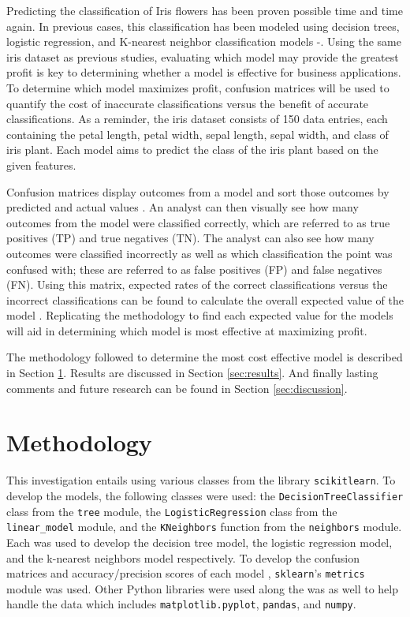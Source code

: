 \documentclass[journal]{IEEEtran}
\begin{document}
Predicting the classification of Iris flowers has been proven possible time and time again. In previous cases, this classification has been modeled using decision trees, logistic regression, and K-nearest neighbor classification models \cite{b1}-\cite{b3}. Using the same iris dataset as previous studies, evaluating which model may provide the greatest profit is key to determining whether a model is effective for business applications. To determine which model maximizes profit, confusion matrices will be used to quantify the cost of inaccurate classifications versus the benefit of accurate classifications. As a reminder, the iris dataset consists of 150 data entries, each containing the petal length, petal width, sepal length, sepal width, and class of iris plant. Each model aims to predict the class of the iris plant based on the given features. 

Confusion matrices display outcomes from a model and sort those outcomes by predicted and actual values \cite{b4}. An analyst can then visually see how many outcomes from the model were classified correctly, which are referred to as true positives (TP) and true negatives (TN). The analyst can also see how many outcomes were classified incorrectly as well as which classification the point was confused with; these are referred to as false positives (FP) and false negatives (FN). Using this matrix, expected rates of the correct classifications versus the incorrect classifications can be found to calculate the overall expected value of the model \cite{b5}. Replicating the methodology to find each expected value for the models will aid in determining which model is most effective at maximizing profit. 

\vspace{10px}

The methodology followed to determine the most cost effective model is described in Section \ref{sec:methodology}. Results are discussed in Section \ref{sec:results}. And finally lasting comments and future research can be found in Section \ref{sec:discussion}.


\section{Methodology}
\label{sec:methodology}

This investigation entails using various classes from the library \lstinline{scikitlearn}. To develop the models, the following classes were used: the \lstinline{DecisionTreeClassifier} class from the \lstinline{tree} module, the \lstinline{LogisticRegression} class from the \lstinline{linear_model} module, and the \lstinline{KNeighbors} function from the \lstinline{neighbors} module. Each was used to develop the decision tree model, the logistic regression model, and the k-nearest neighbors model respectively. To develop the confusion matrices and accuracy/precision scores of each model ,  \lstinline{sklearn}'s \lstinline{metrics} module was used. Other Python libraries were used along the was as well to help handle the data which includes \lstinline{matplotlib.pyplot}, \lstinline{pandas}, and \lstinline{numpy}. 
\end{document}
